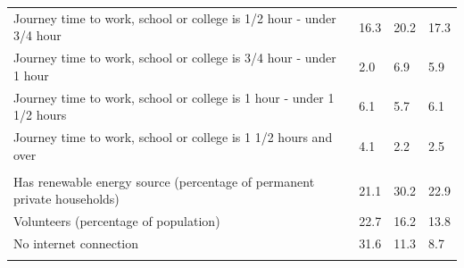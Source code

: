 \documentclass{article}
\begin{document}
\begin{table}[h]
\begin{tabular}{KTTT}
Journey time to work, school or college is 1/2 hour - under 3/4 hour & 16.3& 20.2& 17.3\\
Journey time to work, school or college is 3/4 hour - under 1 hour & 2.0& 6.9& 5.9\\
Journey time to work, school or college is 1 hour - under 1 1/2 hours & 6.1& 5.7& 6.1\\
Journey time to work, school or college is 1 1/2 hours and over & 4.1& 2.2& 2.5\\
\hline
    \\ 
    \hline
Has renewable energy source (percentage of permanent private households) & 21.1& 30.2& 22.9\\
    \hline
Volunteers (percentage of population) & 22.7& 16.2& 13.8\\
    \hline
No internet connection& 31.6& 11.3&  8.7\\
\hline
\end{tabular}
\end{table}
\end{document}
